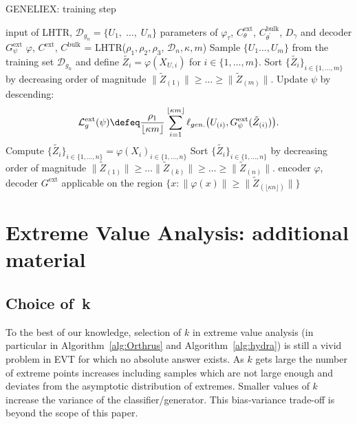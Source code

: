 \begin{algorithm}[t]
\begin{algorithmic}
\end{algorithmic}
\label{alg:Orthrus}
\end{algorithm} \begin{algorithm}[H]
\caption{GENELIEX: training step}
\begin{algorithmic}\INPUT 
input of LHTR, 
$\mathcal{D}_{g_{n}}=\{U_{1},\; \ldots,\; U_{n}\}$
\Initialize parameters of $\varphi_\tau$, $C_\theta^{\text{ext}}$, $C_{\theta^\prime}^{\text{bulk}}$, $D_\gamma$ and decoder $G_\psi^{\text{ext}}$ \Optimization  \Statex  $\varphi$, $C^{\text{ext}}$, $C^{\text{bulk}}$ = LHTR($\rho_1, \rho_2, \rho_3$, $\mathcal{D}_{n},\kappa, m$)
\Statex Sample $\{U_{1} \ldots, U_{m}\}$ from the training set $\mathcal{D}_{g_n}$ and define
$\tilde{Z_i} = \varphi( X_{U,i})$ for $i \in \{1,\ldots, m\}$.
\Statex Sort $\{\tilde{Z_i}\}_{i \in \{1,\ldots, m\}}$ by decreasing order of magnitude
$\|\tilde{Z}_{(1)}\| \geq \ldots \geq \|\tilde{Z}_{(m)}\|.$
\Statex Update $\psi$ by descending:$$\mathcal{L}_g^\text{ext}(\psi) \defeq \frac{\rho_1}{\lfloor{\kappa m}\rfloor}\sum_{i=1}^{\lfloor{\kappa m}\rfloor} \ell_{gen.} \big(U_{(i)}, G^\text{ext}_\psi(\tilde{Z}_{(i)})\big).$$
\EndWhile
\Statex Compute $\{\tilde{Z_i}\}_{i \in \{1,\ldots, n\}} = {\varphi(X_i)}_{i \in \{1,\ldots, n\}}$
\Statex Sort $\{\tilde{Z_i}\}_{i \in \{1,\ldots, n\}}$ by decreasing order of magnitude $\|\tilde{Z}_{(1)}\|\geq \ldots \|\tilde{Z}_{(k)}\|\geq \ldots \geq \|\tilde{Z}_{(n)}\|.$
\OUTPUT encoder $\varphi$, decoder $G^\text{ext}$ applicable on the region $\{x : \|\varphi(x)\| \geq \|\tilde{Z}_{(\lfloor{\kappa n}\rfloor)}\|  \}$ 
\end{algorithmic}
\label{alg:hydra}
\end{algorithm}
%
 

\section{Extreme Value Analysis: additional material}
\label{sec:classif-supplem}

\subsection{Choice of~k}  
To the best of our knowledge, selection of $k$  in extreme value analysis (in particular in  Algorithm~\ref{alg:Orthrus} and Algorithm~\ref{alg:hydra}) is still a vivid problem in EVT for which no absolute answer exists. As $k$ gets large the number of extreme points increases including samples which are not large enough and deviates from the asymptotic distribution of extremes. Smaller values of $k$ increase the variance of the classifier/generator. This bias-variance trade-off is beyond the scope of this paper.

